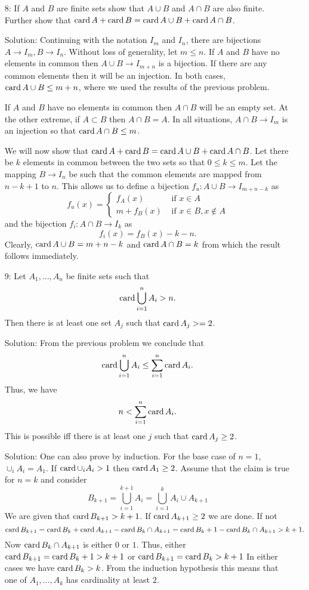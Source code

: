 \begin{enumerate}
\item[8:] If $A$ and $B$ are finite sets show that $A \cup B$ and $A \cap
B$ are also finite. Further show that $\operatorname{card} A + \operatorname{card} B = \operatorname{card} A \cup B
+ \operatorname{card} A \cap B$.
\item[Solution:] Continuing with the notation $I_m$ and $I_n$, there are 
bijections $A \rightarrow I_m, B \rightarrow I_n$. Without loss of 
generality, let $m \le n$. If $A$ and $B$ have no elements in common then
$A \cup B \rightarrow I_{m+n}$ is a bijection. If there are any common
elements then it will be an injection. In both cases, $\operatorname{card} A \cup B \le
m + n$, where we used the results of the previous problem.

If $A$ and $B$ have no elements in common then $A \cap B$ will be an
empty set. At the other extreme, if $A \subset B$ then $A \cap B = A$.
In all situations, $A \cap B \rightarrow I_m$ is an injection so that 
$\operatorname{card} A \cap B \le m$.

We will now show that $\operatorname{card} A + \operatorname{card} B=\operatorname{card} A \cup B + \operatorname{card} A \cap B$.
Let there be $k$ elements in common between the two sets so that $0 \le 
k \le m$. Let the mapping $B \rightarrow I_n$ be such that the common
elements are mapped from $n - k + 1$ to $n$. This allows us to define a
bijection $f_u: A \cup B \rightarrow I_{m + n - k}$ as
\[
f_u(x) = \begin{cases}
f_A(x) & \text{ if } x \in A \\
m + f_B(x) & \text{ if } x \in B, x \notin A
\end{cases}
\]
and the bijection $f_i: A \cap B \rightarrow I_k$ as
\[
f_i(x) = f_B(x) - k - n.
\]
Clearly, $\operatorname{card} A \cup B = m + n - k$ and $\operatorname{card} A \cap B = k$ from which 
the result follows immediately.

\item[9:] Let $A_1, \ldots, A_n$ be finite sets such that 
\[
\operatorname{card}\bigcup_{i=1}^n A_i > n.
\]
Then there is at least one set $A_j$ such that $\operatorname{card} A_j >= 2$.
\item[Solution:] From the previous problem we conclude that
\[
\operatorname{card}\bigcup_{i=1}^n A_i \le \sum_{i=1}^n \operatorname{card} A_i.
\]
Thus, we have 
\[
n < \sum_{i=1}^n \operatorname{card} A_i.
\]
This is possible iff there is at least one $j$ such that $\operatorname{card} A_j \ge 2$.

\item[Solution:] One can also prove by induction. For the base case of 
$n = 1$, $\cup_i A_i = A_1$. If $\operatorname{card} \cup_i A_i > 1$ then $\operatorname{card} A_1 
\ge 2$. Assume that the claim is true for $n = k$ and consider
\[
B_{k+1} = \bigcup_{i=1}^{k+1}A_i = \bigcup_{i=1}^k A_i \cup A_{k+1}
\]
We are given that $\operatorname{card} B_{k+1} > k + 1$. If $\operatorname{card} A_{k+1} \ge 2$ we are
done. If not
\[
\operatorname{card} B_{k+1} = \operatorname{card} B_k + \operatorname{card} A_{k+1} - \operatorname{card} B_k \cap A_{k+1} =
\operatorname{card} B_k + 1 - \operatorname{card} B_k \cap A_{k+1} > k + 1.
\]
Now $\operatorname{card} B_k \cap A_{k+1}$ is either $0$ or $1$. Thus, either $\operatorname{card} 
B_{k+1} = \operatorname{card} B_k + 1 > k + 1$ or $\operatorname{card} B_{k+1} = \operatorname{card} B_k > k + 1$
In either cases we have $\operatorname{card} B_k > k$. From the induction hypothesis this
means that one of $A_1, \ldots, A_k$ has cardinality at least $2$.
\end{enumerate}
